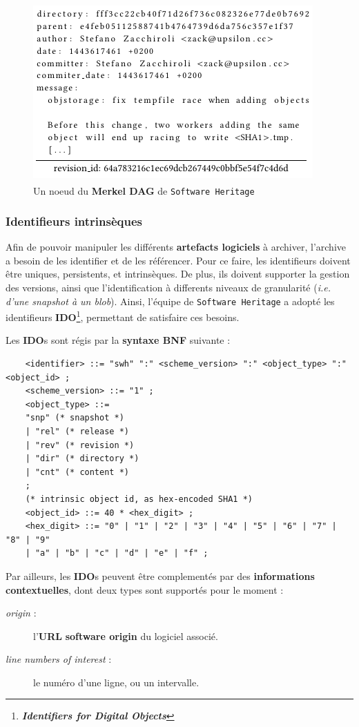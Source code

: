 \documentclass[12pt,a4paper]{report}
\theoremstyle{definition}
\begin{document}
\begin{figure}[!ht]
	\centering
	\includegraphics[scale=0.5]{images/swh/revision_node_example.png}
	\caption{Un noeud du \textbf{Merkel DAG} de \texttt{Software Heritage}\textsuperscript{\citep{dicosmoWhyAndHow}}}
	\label{fig:swh_revision_node}
\end{figure}

\subsubsection{Identifieurs intrinsèques}
Afin de pouvoir manipuler les différents \textbf{artefacts logiciels} à archiver, l'archive a besoin de les identifier et de les référencer. Pour ce faire, les identifieurs doivent être uniques, persistents, et intrinsèques. De plus, ils doivent supporter la gestion des versions, ainsi que l'identification à differents niveaux de granularité (\textit{i.e. d'une snapshot à un blob}). Ainsi, l'équipe de \texttt{Software Heritage} a adopté les identifieurs \textbf{IDO}\footnote{\textbf{\textit{Identifiers for Digital Objects}}}, permettant de satisfaire ces besoins\textsuperscript{\citep{dicosmoIDO}}.

Les \textbf{IDO}s sont régis par la \textbf{syntaxe BNF} suivante :
\begin{verbatim}
	<identifier> ::= "swh" ":" <scheme_version> ":" <object_type> ":" <object_id> ;
	<scheme_version> ::= "1" ;
	<object_type> ::=
	"snp" (* snapshot *)
	| "rel" (* release *)
	| "rev" (* revision *)
	| "dir" (* directory *)
	| "cnt" (* content *)
	;
	(* intrinsic object id, as hex-encoded SHA1 *)
	<object_id> ::= 40 * <hex_digit> ;
	<hex_digit> ::= "0" | "1" | "2" | "3" | "4" | "5" | "6" | "7" | "8" | "9"
	| "a" | "b" | "c" | "d" | "e" | "f" ;
\end{verbatim}

Par ailleurs, les \textbf{IDO}s peuvent être complementés par des \textbf{informations contextuelles}, dont deux types sont supportés pour le moment :
\begin{description}
	\item [\textit{origin} :] l'\textbf{URL} \textbf{software origin} du logiciel associé.
	\item [\textit{line numbers of interest} :] le numéro d'une ligne, ou un intervalle.
\end{description}
\end{document}
